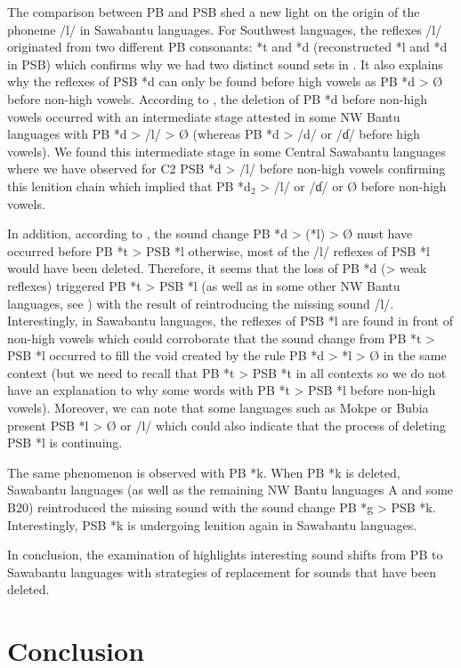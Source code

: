 \documentclass[output=paper,colorlinks,citecolor=brown
]{langscibook}
\begin{document}
The comparison between PB and PSB shed a new light on the origin of the phoneme /l/ in Sawabantu languages. For Southwest languages, the reflexes /l/ originated from two different PB consonants: *t and *d (reconstructed *l and *d in PSB) which confirms why we had two distinct sound sets in . It also explains why the reflexes of PSB *d can only be found before high vowels as PB *d > Ø before non-high vowels. According to \citet[34]{philippson2022}, the deletion of PB *d before non-high vowels occurred with an intermediate stage attested in some NW Bantu languages with PB *d > /l/ > Ø (whereas PB *d > /d/ or /ɗ/ before high vowels). We found this intermediate stage in some Central Sawabantu languages where we have observed for C2 PSB *d > /l/ before non-high vowels confirming this lenition chain which implied that PB *d$_2$ > /l/ or /ɗ/ or Ø before non-high vowels. 

In addition, according to \citet[37]{philippson2022}, the sound change PB *d > (*l) > Ø must have occurred before PB *t > PSB *l otherwise, most of the /l/ reflexes of PSB *l would have been deleted. Therefore, it seems that the loss of PB *d (> weak reflexes) triggered PB *t > PSB *l (as well as in some other NW Bantu languages, see \citealt[30-31]{philippson2022}) with the result of reintroducing the missing sound /l/. Interestingly, in Sawabantu languages, the reflexes of PSB *l are found in front of non-high vowels which could corroborate that the sound change from PB *t > PSB *l occurred to fill the void created by the rule PB *d > *l > Ø in the same context (but we need to recall that PB *t > PSB *t in all contexts so we do not have an explanation to why some words with PB *t > PSB *l before non-high vowels). Moreover, we can note that some languages such as Mokpe or Bubia present PSB *l > Ø or /l/ which could also indicate that the process of deleting PSB *l is continuing. 

The same phenomenon is observed with PB *k. When PB *k is deleted, Sawabantu languages (as well as the remaining NW Bantu languages A and some B20) reintroduced the missing sound with the sound change PB *g > PSB *k. Interestingly, PSB *k is undergoing lenition again in Sawabantu languages. 

In conclusion, the examination of  highlights interesting sound shifts from PB to Sawabantu languages with strategies of replacement for sounds that have been deleted.

\section{Conclusion} \label{sect:browngrollemundrule:conclusion}
\end{document}
